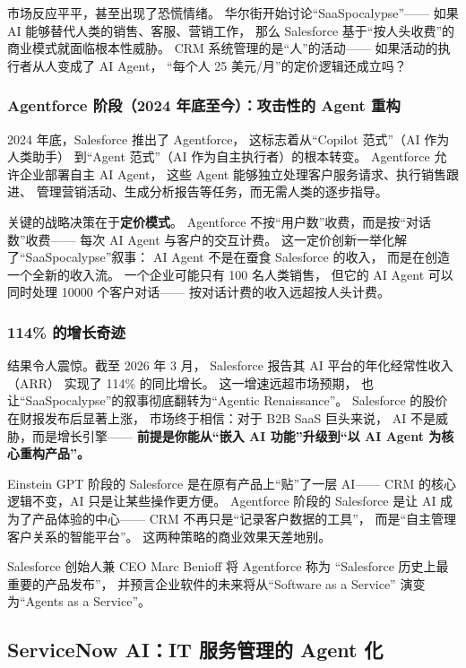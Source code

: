 市场反应平平，甚至出现了恐慌情绪。
华尔街开始讨论``SaaSpocalypse''——
如果 AI 能够替代人类的销售、客服、营销工作，
那么 Salesforce 基于``按人头收费''的商业模式就面临根本性威胁。
CRM 系统管理的是``人''的活动——
如果活动的执行者从人变成了 AI Agent，
``每个人 25 美元/月''的定价逻辑还成立吗？

\subsubsection{Agentforce 阶段（2024 年底至今）：攻击性的 Agent 重构}
2024 年底，Salesforce 推出了 Agentforce，
这标志着从``Copilot 范式''（AI 作为人类助手）
到``Agent 范式''（AI 作为自主执行者）的根本转变。
Agentforce 允许企业部署自主 AI Agent，
这些 Agent 能够独立处理客户服务请求、执行销售跟进、
管理营销活动、生成分析报告等任务，而无需人类的逐步指导。

关键的战略决策在于\textbf{定价模式}。
Agentforce 不按``用户数''收费，而是按``对话数''收费——
每次 AI Agent 与客户的交互计费。
这一定价创新一举化解了``SaaSpocalypse''叙事：
AI Agent 不是在蚕食 Salesforce 的收入，
而是在创造一个全新的收入流。
一个企业可能只有 100 名人类销售，
但它的 AI Agent 可以同时处理 10000 个客户对话——
按对话计费的收入远超按人头计费。

\subsubsection{114\% 的增长奇迹}
结果令人震惊。截至 2026 年 3 月，
Salesforce 报告其 AI 平台的年化经常性收入（ARR）
实现了 114\% 的同比增长。
这一增速远超市场预期，
也让``SaaSpocalypse''的叙事彻底翻转为``Agentic Renaissance''。
Salesforce 的股价在财报发布后显著上涨，
市场终于相信：对于 B2B SaaS 巨头来说，
AI 不是威胁，而是增长引擎——
\textbf{前提是你能从``嵌入 AI 功能''升级到``以 AI Agent 为核心重构产品''。}

Einstein GPT 阶段的 Salesforce 是在原有产品上``贴''了一层 AI——
CRM 的核心逻辑不变，AI 只是让某些操作更方便。
Agentforce 阶段的 Salesforce 是让 AI 成为了产品体验的中心——
CRM 不再只是``记录客户数据的工具''，
而是``自主管理客户关系的智能平台''。
这两种策略的商业效果天差地别。

Salesforce 创始人兼 CEO Marc Benioff 将 Agentforce 称为
``Salesforce 历史上最重要的产品发布''，
并预言企业软件的未来将从``Software as a Service''
演变为``Agents as a Service''。

\subsection{ServiceNow AI：IT 服务管理的 Agent 化}

